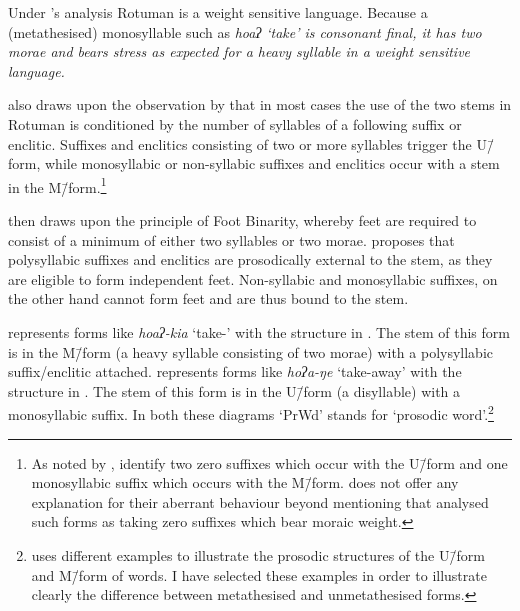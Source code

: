Under \citeauthor{mcc00}'s analysis Rotuman is a weight sensitive language.
Because a (metathesised) monosyllable such as \it{hoaʔ} `take' is
consonant final, it has two morae and bears stress
as expected for a heavy syllable in a weight sensitive language.

\cite{mcc00} also draws upon the observation
by \cite{haki98} that in most cases the use of the two stems in Rotuman
is conditioned by the number of syllables of a following suffix or enclitic.
Suffixes and enclitics consisting of two or more syllables trigger the U\=/form,
while monosyllabic or non-syllabic suffixes and enclitics occur
with a stem in the M\=/form.\footnote{\label{fn:Problem2}
		As noted by \cite[162]{mcc00}, \citet{haki98} identify
		two zero suffixes which occur with the U\=/form
		and one monosyllabic suffix which occurs with the M\=/form.
		\cite{mcc00} does not offer any explanation for their
		aberrant behaviour beyond mentioning that \citet{haki98} analysed such
		forms as taking zero suffixes which bear moraic weight.}

\citet[156]{mcc00} then draws upon the principle of Foot Binarity,
whereby feet are required to consist of a minimum of either two syllables or two morae.
\citeauthor{mcc00} proposes that polysyllabic suffixes and enclitics
are prosodically external to the stem, as they are eligible to form independent feet.
Non-syllabic and monosyllabic suffixes, on the other hand cannot form feet and are thus bound to the stem.

\citet[163]{mcc00} represents forms like \emph{hoaʔ-kia}
`take-' with the structure in .
The stem of this form is in the M\=/form
(a heavy syllable consisting of two morae)
with a polysyllabic suffix/enclitic attached.
\citeauthor{mcc00} represents forms like \emph{hoʔa-ŋe} `take-away'
with the structure in .
The stem of this form is in the U\=/form (a disyllable) with a monosyllabic suffix.
In both these diagrams `PrWd' stands for `prosodic word'.\footnote{
		\cite{mcc00} uses different examples to illustrate the prosodic
		structures of the U\=/form and M\=/form of words.
		I have selected these examples in order to illustrate
		clearly the difference between metathesised and unmetathesised forms.}

